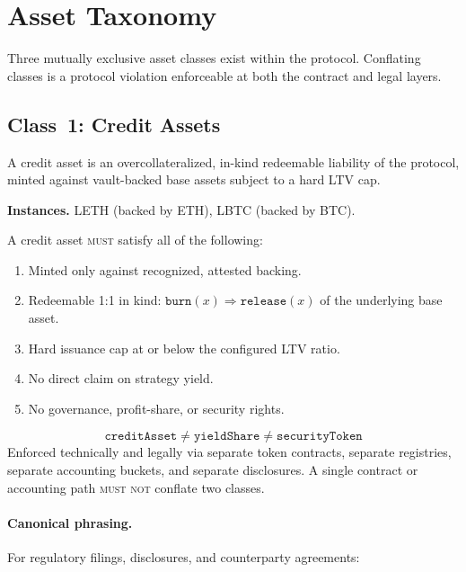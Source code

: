 \section{Asset Taxonomy}

\label{sec:taxonomy}

Three mutually exclusive asset classes exist within the protocol. Conflating classes is a protocol violation enforceable at both the contract and legal layers.

\subsection{Class~1: Credit Assets}
\label{sec:credit}

\begin{definition}
A credit asset is an overcollateralized, in-kind redeemable liability of the protocol, minted against vault-backed base assets subject to a hard LTV cap.
\end{definition}

\noindent\textbf{Instances.} LETH (backed by ETH), LBTC (backed by BTC).

\begin{requirement}
\label{req:credit}
A credit asset \textsc{must} satisfy all of the following:
\begin{enumerate}[nosep]
  \item Minted only against recognized, attested backing.
  \item Redeemable 1:1 in kind: $\texttt{burn}(x) \Rightarrow \texttt{release}(x)$ of the underlying base asset.
  \item Hard issuance cap at or below the configured LTV ratio.
  \item No direct claim on strategy yield.
  \item No governance, profit-share, or security rights.
\end{enumerate}
\end{requirement}

\begin{invariant}
\label{inv:class-sep}
\[
  \texttt{creditAsset} \neq \texttt{yieldShare} \neq \texttt{securityToken}
\]
Enforced technically and legally via separate token contracts, separate registries, separate accounting buckets, and separate disclosures. A single contract or accounting path \textsc{must not} conflate two classes.
\end{invariant}

\paragraph{Canonical phrasing.} For regulatory filings, disclosures, and counterparty agreements:

